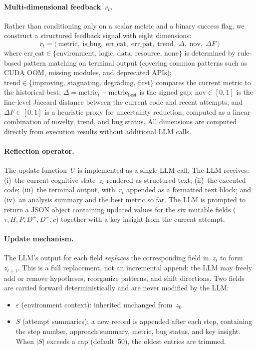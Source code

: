 \documentclass{article} %
\newcommand{\zt}{z_t}
\newcommand{\ztnext}{z_{t+1}}
\newcommand{\rt}{r_t}
\begin{document}
\paragraph{Multi-dimensional feedback~$\rt$.}
Rather than conditioning only on a scalar metric and a binary success flag, we
construct a structured feedback signal with eight dimensions:
\begin{equation}
  \rt = \big(\,\text{metric},\;
  \text{is\_bug},\;
  \text{err\_cat},\;
  \text{err\_pat},\;
  \text{trend},\;
  \Delta,\;
  \text{nov},\;
  \Delta F\,\big)
  \label{eq:feedback}
\end{equation}
where $\text{err\_cat} \in
\{\text{environment, logic, data, resource, none}\}$ is determined by
rule-based pattern matching on terminal output (covering common patterns such
as CUDA OOM, missing modules, and deprecated APIs);
$\text{trend} \in \{\text{improving, stagnating, degrading, first}\}$ compares
the current metric to the historical best;
$\Delta = \text{metric}_t - \text{metric}_{\text{best}}$ is the signed gap;
$\text{nov} \in [0, 1]$ is the line-level Jaccard distance between the current
code and recent attempts;
and $\Delta F \in [0, 1]$ is a heuristic proxy for uncertainty reduction,
computed as a linear combination of novelty, trend, and bug status.
All dimensions are computed directly from execution results without additional
LLM calls.

\paragraph{Reflection operator.}
The update function~$U$ is implemented as a single LLM call. The LLM receives:
(i)~the current cognitive state~$\zt$ rendered as structured text;
(ii)~the executed code;
(iii)~the terminal output, with~$\rt$ appended as a formatted text block; and
(iv)~an analysis summary and the best metric so far.
The LLM is prompted to return a JSON object containing updated values for the
six mutable fields ($\tau, H, P, D^{+}, D^{-}, c$) together with a key
insight from the current attempt.

\paragraph{Update mechanism.}
The LLM's output for each field \emph{replaces} the corresponding field
in~$\zt$ to form~$\ztnext$. This is a full replacement, not an incremental
append: the LLM may freely add or remove hypotheses, reorganize patterns, and
shift directions. Two fields are carried forward deterministically and are
never modified by the LLM:
\begin{itemize}
  \item $\varepsilon$ (environment context): inherited unchanged from~$z_0$.
  \item $S$ (attempt summaries): a new record is appended after each step,
  containing the step number, approach summary, metric, bug status, and key
  insight. When $|S|$ exceeds a cap (default~50), the oldest entries are
  trimmed.
\end{itemize}
\end{document}
